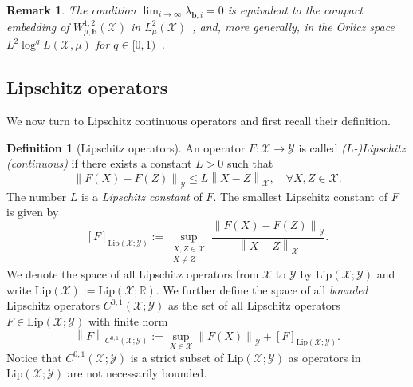 \documentclass[namedate,webpdf]{ima-authoring-template-blank}
\newcommand*{\Lip}{\mathrm{Lip}}  %
\newcommand*{\nm}[1]{{\left\|#1\right \|}}
\newcounter{counter}
\numberwithin{counter}{section}
\numberwithin{equation}{section}
\theoremstyle{plain}
\newtheorem{remark}[counter]{Remark}
\theoremstyle{definition}
\newtheorem{definition}[counter]{Definition}
\newcommand*{\cX}{\mathcal{X}}
\newcommand*{\cY}{\mathcal{Y}}
\newcommand*{\bbR}{\mathbb{R}}
\theoremstyle{thmstyletwo}
\begin{document}
\begin{remark}
\label{rmk: PCA conditions and embeddings}
    The condition \(\lim_{i \to \infty} \lambda_{\bm{b}, i} = 0\) is equivalent to the compact embedding of \(W_{\mu, \bm{b}}^{1,2}(\cX)\) in \(L_{\mu}^2(\cX)\)~\citep[Prop. 2.2]{daprato_RegularDensitiesInvariantMeasures_1995}, and, more generally, in the Orlicz space \(L^2 \log^q L(\cX, \mu)\) for \(q \in [0, 1)\)~\citep[Thm. 5.2]{luo_SobolevEmbeddingsInfiniteDimensions_2023}.
\end{remark}


\subsection{Lipschitz operators}
\label{subsec: Lipschitz operators}

We now turn to Lipschitz continuous operators and first recall their definition. 
\begin{definition}[Lipschitz operators]
    An operator \(F: \cX \to \cY\) is called \emph{(\(L\)-)Lipschitz (continuous)} if there exists a constant \(L > 0\) such that
    \[
    \nm{F(X) - F(Z)}_{\cY} \leq L \nm{X - Z}_{\cX}, \quad \forall X, Z \in \cX.
    \]
    The number \(L\) is a \emph{Lipschitz constant} of \(F\). The smallest Lipschitz constant of \(F\) is given by 
    \[
    [F]_{\Lip(\cX; \cY)} := \sup_{\substack{X, Z \in \cX \\ X \neq Z}} \frac{\nm{F(X) - F(Z)}_{\cY}}{\nm{X - Z}_{\cX}}.
    \]
    We denote the space of all Lipschitz operators from \(\cX\) to \(\cY\) by \(\Lip(\cX; \cY)\) and write \(\Lip(\cX) := \Lip(\cX; \bbR)\). 
    We further define the space of all \emph{bounded} Lipschitz operators \(C^{0,1}(\cX;\cY)\) as the set of all Lipschitz operators \(F \in \Lip(\cX; \cY)\) with finite norm 
    \[
    \nm{F}_{C^{0, 1}(\cX; \cY)} 
    := \sup_{X \in \cX} \nm{F(X)}_{\cY} + [F]_{\Lip(\cX; \cY)}.
    \]
    Notice that \(C^{0, 1}(\cX; \cY)\) is a strict subset of \(\Lip(\cX; \cY)\) as operators in \(\Lip(\cX; \cY)\) are not necessarily bounded.
\end{definition}
\end{document}
